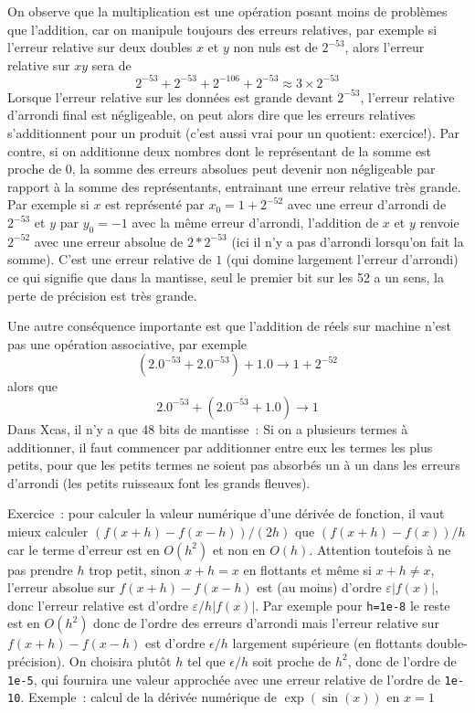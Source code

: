 \documentclass[a4paper,11pt]{article}
\begin{document}
\begin{giacjshere}
On observe que la multiplication est une opération posant moins
de problèmes que l'addition, car on manipule toujours des erreurs
relatives, par exemple si l'erreur relative sur deux doubles
$x$ et $y$ non nuls
est de $2^{-53}$, alors l'erreur relative sur $xy$ sera de 
\[ 2^{-53} + 2^{-53} + 2^{-106} + 2^{-53} \approx 3 \times 2^{-53} \]
Lorsque l'erreur relative sur les données est grande devant $2^{-53}$,
l'erreur relative d'arrondi final est négligeable, on peut alors dire que
les erreurs relatives s'additionnent pour un produit (c'est aussi vrai
pour un quotient: exercice!).
Par contre, si on additionne deux nombres dont le représentant de
la somme est proche de 0, la somme des erreurs absolues peut
devenir non négligeable par rapport à la somme des représentants, entrainant
une erreur relative très grande. Par exemple si $x$ est représenté
par $x_0=1+2^{-52}$ avec
une erreur d'arrondi de $2^{-53}$ et
$y$ par $y_0=-1$ avec la même erreur d'arrondi, 
l'addition de $x$ et $y$ renvoie $2^{-52}$ avec une erreur
absolue de $2 * 2^{-53}$ (ici il n'y a pas d'arrondi lorsqu'on fait la somme).
C'est une erreur relative de $1$ (qui domine largement
l'erreur d'arrondi) ce qui signifie que dans la mantisse, seul le
premier bit sur les 52 a un sens, la perte de précision est très grande.

Une autre conséquence importante est que l'addition de réels sur machine
n'est pas une opération associative,
par exemple
\[ (2.0^{-53}+2.0^{-53})+1.0 \rightarrow 1+2^{-52} \]
alors que
\[ 2.0^{-53}+(2.0^{-53}+1.0) \rightarrow 1 \]
Dans Xcas, il n'y a que 48 bits de mantisse~:
Si on a plusieurs termes
à additionner, il faut commencer par additionner entre eux
les termes les plus petits, pour que les petits termes ne soient
pas absorbés un à un dans les erreurs d'arrondi (les petits ruisseaux
font les grands fleuves).

Exercice~: pour calculer la valeur
num\'erique d'une d\'eriv\'ee de fonction, il vaut mieux
calculer $(f(x+h)-f(x-h))/(2h)$ que $(f(x+h)-f(x))/h$ car le terme
d'erreur est en $O(h^2)$ et non en $O(h)$. Attention
toutefois \`a ne pas prendre $h$ trop petit, sinon $x+h=x$
en flottants et m\^eme si $x+h \neq x$, l'erreur absolue sur
$f(x+h)-f(x-h)$ est (au moins) d'ordre $\varepsilon |f(x)|$, donc l'erreur
relative est d'ordre $\varepsilon/h |f(x)|$. 
Par exemple pour {\tt h=1e-8} le reste est en $O(h^2)$ donc
de l'ordre des erreurs d'arrondi mais l'erreur relative sur
$f(x+h)-f(x-h)$ est d'ordre $\epsilon/h$ largement sup\'erieure
(en flottants double-pr\'ecision). On choisira plut\^ot $h$ tel que
$\epsilon/h$ soit proche de $h^2$, donc de l'ordre de {\tt 1e-5}, qui
fournira une valeur approch\'ee avec une erreur relative de l'ordre
de {\tt 1e-10}.
Exemple~: calcul de la d\'eriv\'ee num\'erique de $\exp(\sin(x))$ en $x=1$


\end{giacjshere}
\end{document}
